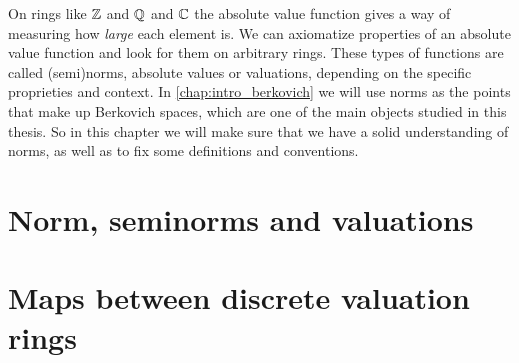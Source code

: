 On rings like $\mathbb{Z}$ and $\mathbb{Q}$ and $\mathbb{C}$ the absolute value function gives a way of measuring how \emph{large} each element is. 
We can axiomatize properties of an absolute value function and look for them on arbitrary rings. 
These types of functions are called (semi)norms, absolute values or valuations, depending on the specific proprieties and context.  
In \cref{chap:intro_berkovich} we will use norms as the points that make up Berkovich spaces, which are one of the main objects studied in this thesis. 
So in this chapter we will make sure that we have a solid understanding of norms, as well as to fix some definitions and conventions.


\section{Norm, seminorms and valuations} \label{sec:norm,_seminorms_and_valuations}


\section{Maps between discrete valuation rings} \label{sec:maps_between_discrete_valuation_rings}


